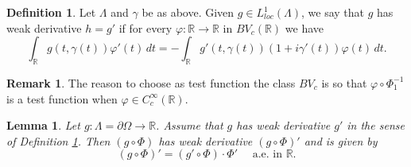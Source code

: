\documentclass[12pt]{amsart}
\newcommand{\R}{\mathbb{R}}
\theoremstyle{plain}
\newtheorem{lemma}[theorem]{Lemma}
\theoremstyle{definition}
\newtheorem{definition}[theorem]{Definition}
\newtheorem{remark}[theorem]{Remark}
\numberwithin{equation}{section}
\begin{document}
\begin{definition}\label{def:definicionDefinitivaDerivadaDebilFrontera}
     Let $\Lambda$ and $\gamma$ be as above. Given $g\in L_{loc}^1(\Lambda)$, we say that $g$ has weak derivative $h=g'$ if for every $\varphi\colon \R\to\R$ in $BV_c(\R)$ we have
    \begin{equation}\label{eq:derivadaDebilCLNstyle}
    \int_{\R}g(t,\gamma(t))\varphi'(t)\, dt
    =
    -\int_{\R}g'(t,\gamma(t))(1+i\gamma'(t))\varphi(t)\, dt.    
    \end{equation}
\end{definition}


\begin{remark}
The reason to choose as test function the class $BV_{c}$ 
is so that $\varphi\circ\Phi_1^{-1}$ is a test function when $\varphi\in C_c^{\infty}(\R)$.
\end{remark}


\begin{lemma}\label{lemma:derivadaDatoDirichlet}
    Let $g\colon \Lambda=\partial\Omega\to \R$. Assume that $g$ has weak derivative $g'$ in the sense of Definition \ref{def:definicionDefinitivaDerivadaDebilFrontera}. Then $(g\circ\Phi)$ has weak derivative $(g\circ\Phi)'$  and is given by
    \begin{equation}\label{eq:expresionDerivada}
    (g\circ\Phi)'
    =
    (g'\circ\Phi)\cdot \Phi'\quad \text{ a.e. in }\R.    
    \end{equation}
\end{lemma}
\end{document}
